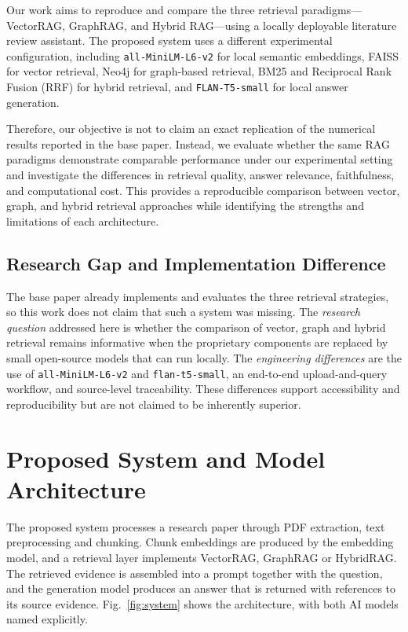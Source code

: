 \documentclass[conference]{IEEEtran}
\begin{document}
Our work aims to reproduce and compare the three retrieval paradigms---VectorRAG, GraphRAG, and Hybrid RAG---using a locally deployable literature review assistant. The proposed system uses a different experimental configuration, including \texttt{all-MiniLM-L6-v2} for local semantic embeddings, FAISS for vector retrieval, Neo4j for graph-based retrieval, BM25 and Reciprocal Rank Fusion (RRF) for hybrid retrieval, and \texttt{FLAN-T5-small} for local answer generation.

Therefore, our objective is not to claim an exact replication of the numerical results reported in the base paper. Instead, we evaluate whether the same RAG paradigms demonstrate comparable performance under our experimental setting and investigate the differences in retrieval quality, answer relevance, faithfulness, and computational cost. This provides a reproducible comparison between vector, graph, and hybrid retrieval approaches while identifying the strengths and limitations of each architecture.


\subsection{Research Gap and Implementation Difference}
The base paper already implements and evaluates the three retrieval strategies, so this work does not claim that such a system was missing. The \emph{research question} addressed here is whether the comparison of vector, graph and hybrid retrieval remains informative when the proprietary components are replaced by small open-source models that can run locally. The \emph{engineering differences} are the use of \texttt{all-MiniLM-L6-v2} and \texttt{flan-t5-small}, an end-to-end upload-and-query workflow, and source-level traceability. These differences support accessibility and reproducibility but are not claimed to be inherently superior.

\section{Proposed System and Model Architecture}
\label{sec:system}
The proposed system processes a research paper through PDF extraction, text preprocessing and chunking. Chunk embeddings are produced by the embedding model, and a retrieval layer implements VectorRAG, GraphRAG or HybridRAG. The retrieved evidence is assembled into a prompt together with the question, and the generation model produces an answer that is returned with references to its source evidence. Fig.~\ref{fig:system} shows the architecture, with both AI models named explicitly.
\end{document}
